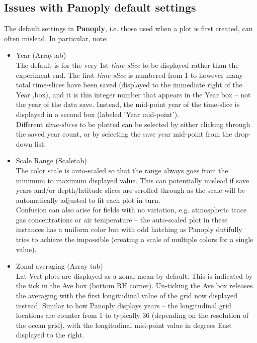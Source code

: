 \documentclass[11pt,fleqn]{book} %
\begin{document}

\subsection{Issues with Panoply default settings}

The default settings in \textbf{Panoply}, i.e. those used when a plot is first created, can often mislead. In particular, note:
\begin{itemize}
\item \footnotesize\textsf{Year }\normalsize (\footnotesize\textsf{Array}\normalsize tab)
        \\ The default is for the very 1st \textit{time-slice} to be displayed rather than the experiment end. The first \textit{time-slice} is numbered from 1 to however many total time-slices have been saved (displayed to the immediate right of the \footnotesize\textsf{Year ,}\normalsize box), and it is this integer number that appears in the \footnotesize\textsf{Year }\normalsize box -- not the year of the data save. Instead, the mid-point year of the time-slice is displayed in a second box (labeled '\footnotesize\textsf{Year mid-point}\normalsize').
        \\ Different \textit{time-slices} to be plotted can be selected by either clicking through the saved year count, or by selecting the save year mid-point from the drop-down list.
\item \footnotesize\textsf{Scale Range }\normalsize (\footnotesize\textsf{Scale}\normalsize tab)
        \\ The color scale is auto-scaled so that the range always goes from the minimum to maximum displayed value. This can potentially mislead if save years and/or depth/latitude slices are scrolled through as the scale will be automatically adjusted to fit each plot in turn.
        \\ Confusion can also arise for fields with no variation, e.g. atmospheric trace gas concentrations or air temperature -- the auto-scaled plot in these instances has a uniform color but with odd hatching as Panoply dutifully tries to achieve the impossible (creating a scale of multiple colors for a single value).
\item Zonal averaging (\footnotesize\textsf{Array }\normalsize tab)
        \\ \footnotesize\textsf{Lat-Vert }\normalsize plots are displayed as a zonal mean by default. This is indicated by the tick in the \footnotesize\textsf{Ave }\normalsize box (bottom RH corner). Un-ticking the \footnotesize\textsf{Ave }\normalsize box releases the averaging with the first longitudinal value of the grid now displayed instead. Similar to how Panoply displays years -- the longitudinal grid locations are counter from 1 to typically 36 (depending on the resolution of the ocean grid), with the longitudinal mid-point value in degrees East displayed to the right.

\end{itemize}
\end{document}

